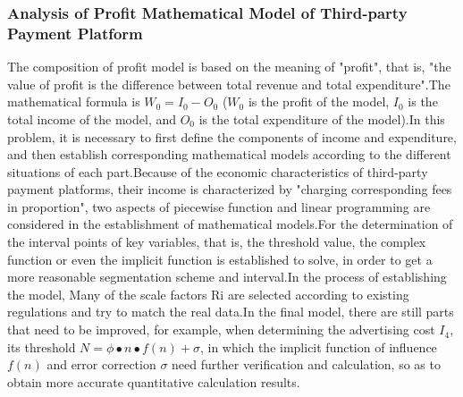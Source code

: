 \documentclass[../mcmpaper]{subfiles}
\begin{document}
\subsubsection{Analysis of Profit Mathematical Model of Third-party Payment Platform}
The composition of profit model is based on the meaning of "profit", that is, "the value of profit is the difference between total revenue and total expenditure".The mathematical formula is $W_0=I_0-O_0$ ($W_0$ is the profit of the model, $I_0$ is the total income of the model, and $O_0$ is the total expenditure of the model).In this problem, it is necessary to first define the components of income and expenditure, and then establish corresponding mathematical models according to the different situations of each part.Because of the economic characteristics of third-party payment platforms, their income is characterized by "charging corresponding fees in proportion", two aspects of piecewise function and linear programming are considered in the establishment of mathematical models.For the determination of the interval points of key variables, that is, the threshold value, the complex function or even the implicit function is established to solve, in order to get a more reasonable segmentation scheme and interval.In the process of establishing the model, Many of the scale factors Ri are selected according to existing regulations and try to match the real data.In the final model, there are still parts that need to be improved, for example, when determining the advertising cost $I_4$, its threshold $N=\phi\bullet n\bullet f(n)+\sigma$, in which the implicit function of influence $f(n)$ and error correction $\sigma$ need further verification and calculation, so as to obtain more accurate quantitative calculation results.
\end{document}
